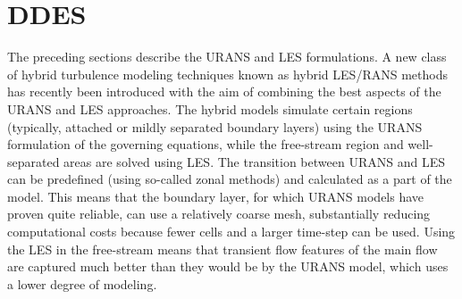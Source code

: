 \section{DDES}
The preceding sections describe the URANS and LES formulations. A new class of hybrid turbulence modeling techniques known as hybrid LES/RANS methods has recently been introduced with the aim of combining the best aspects of the URANS and LES approaches. The hybrid models simulate certain regions (typically, attached or mildly separated boundary layers) using the URANS formulation of the governing equations, while the free-stream region and well-separated areas are solved using LES. The transition between URANS and LES can be predefined (using so-called zonal methods) and calculated as a part of the model. This means that the boundary layer, for which URANS models have proven quite reliable, can use a relatively coarse mesh, substantially reducing computational costs because fewer cells and a larger time-step can be used. Using the LES in the free-stream means that transient flow features of the main flow are captured much better than they would be by the URANS model, which uses a lower degree of modeling.

